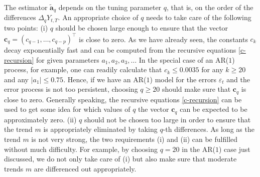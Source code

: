 The estimator $\widetilde{\boldsymbol{a}}_q$ depends on the tuning parameter $q$, that is, on the order of the differences $\Delta_q Y_{t,T}$. An appropriate choice of $q$ needs to take care of the following two points: 
(i) $q$ should be chosen large enough to ensure that the vector $\boldsymbol{c}_q = (c_{q-1},\dots,c_{q-p})^\top$ is close to zero. As we have already seen, the constants $c_k$ decay exponentially fast and can be computed from the recursive equations \eqref{c-recursion} for given parameters $a_1,a_2,a_3,\ldots$ In the special case of an AR($1$) process, for example, one can readily calculate that $c_k \le 0.0035$ for any $k \ge 20$ and any $|a_1| \le 0.75$. Hence, if we have an AR($1$) model for the errors $\varepsilon_t$ and the error process is not too persistent, choosing $q \ge 20$ should make sure that $\boldsymbol{c}_q$ is close to zero. Generally speaking, the recursive equations \eqref{c-recursion} can be used to get some idea for which values of $q$ the vector $\boldsymbol{c}_q$ can be expected to be approximately zero. 
(ii) $q$ should not be chosen too large in order to ensure that the trend $m$ is appropriately eliminated by taking $q$-th differences. As long as the trend $m$ is not very strong, the two requirements (i) and (ii) can be fulfilled without much difficulty. For example, by choosing $q = 20$ in the AR($1$) case just discussed, we do not only take care of (i) but also make sure that moderate trends $m$ are differenced out appropriately. 


